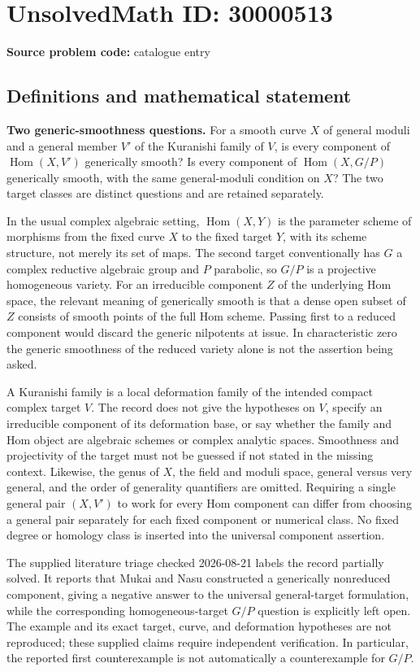 \documentclass[11pt]{article}
\begin{document}
\section*{UnsolvedMath ID: 30000513}
\textbf{Source problem code:} catalogue entry
\subsection{Definitions and mathematical statement}
\textbf{Two generic-smoothness questions.} For a smooth curve \(X\) of general moduli and a general member \(V'\) of the Kuranishi family of \(V\), is every component of \(\operatorname{Hom}(X,V')\) generically smooth? Is every component of \(\operatorname{Hom}(X,G/P)\) generically smooth, with the same general-moduli condition on \(X\)? The two target classes are distinct questions and are retained separately.\par In the usual complex algebraic setting, \(\operatorname{Hom}(X,Y)\) is the parameter scheme of morphisms from the fixed curve \(X\) to the fixed target \(Y\), with its scheme structure, not merely its set of maps. The second target conventionally has \(G\) a complex reductive algebraic group and \(P\) parabolic, so \(G/P\) is a projective homogeneous variety. For an irreducible component \(Z\) of the underlying Hom space, the relevant meaning of generically smooth is that a dense open subset of \(Z\) consists of smooth points of the full Hom scheme. Passing first to a reduced component would discard the generic nilpotents at issue. In characteristic zero the generic smoothness of the reduced variety alone is not the assertion being asked.\par A Kuranishi family is a local deformation family of the intended compact complex target \(V\). The record does not give the hypotheses on \(V\), specify an irreducible component of its deformation base, or say whether the family and Hom object are algebraic schemes or complex analytic spaces. Smoothness and projectivity of the target must not be guessed if not stated in the missing context. Likewise, the genus of \(X\), the field and moduli space, general versus very general, and the order of generality quantifiers are omitted. Requiring a single general pair \((X,V')\) to work for every Hom component can differ from choosing a general pair separately for each fixed component or numerical class. No fixed degree or homology class is inserted into the universal component assertion.\par The supplied literature triage checked 2026-08-21 labels the record partially solved. It reports that Mukai and Nasu constructed a generically nonreduced component, giving a negative answer to the universal general-target formulation, while the corresponding homogeneous-target \(G/P\) question is explicitly left open. The example and its exact target, curve, and deformation hypotheses are not reproduced; these supplied claims require independent verification. In particular, the reported first counterexample is not automatically a counterexample for \(G/P\).
\end{document}
